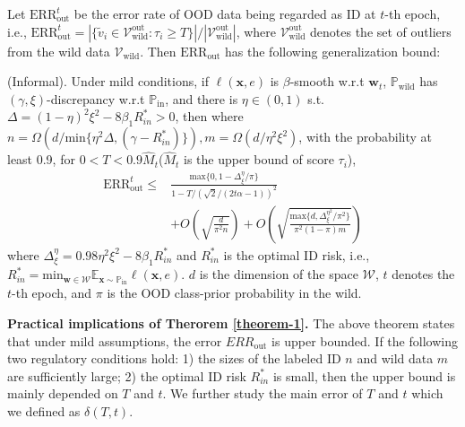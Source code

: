 Let $\text{ERR}_{\text{out}}^t$ be the error rate of OOD data being regarded as ID at $t$-th epoch, i.e.,  $\text{ERR}_{\text{out}}^t = | \{\tilde{v}_i \in \mathcal{V}_{\text{wild}}^{\text{out}}: \tau_i \geq T \} | / |  \mathcal{V}_{\text{wild}}^{\text{out}} |$, where $\mathcal{V}_{\text{wild}}^{\text{out}}$ denotes the set of outliers from the wild data $\mathcal{V}_{\text{wild}}$. Then $\text{ERR}_{\text{out}} $ has the following generalization bound:
\begin{theorem}\label{theorem-1}
(Informal). Under mild conditions, if $\ell(\mathbf{x}, e)$ is $\beta$-smooth w.r.t $\mathbf{w}_t$, $\mathbb{P}_{\mathrm{wild}}$ has $(\gamma, \xi)$-discrepancy w.r.t $\mathbb{P}_{\mathrm{in}}$, and there is $\eta \in (0,1)$ s.t. $\Delta = (1-\eta)^2\xi^2 - 8\beta_1 R_{in}^{*}>0$, then where $n = \Omega(d/\mathrm{min}\{ \eta^2\Delta, (\gamma-R_{in}^{*})\}), m = \Omega(d/\eta^2\xi^2)$, with the probability at least 0.9, for $0 < T < 0.9\widehat{M}_t$($\widehat{M}_t$ is the upper bound of score $\tau_i$),
\begin{equation} \label{equa:ERR_out^t}
\begin{split}
     \text{ERR}_{\text{out}}^t \leq & \frac{\mathrm{max}\{0, 1-\Delta_{\xi}^{\eta}/\pi\}}{1-T/(\sqrt{2}/(2t\alpha - 1))^2}\\
     &+ O(\sqrt{\frac{d}{\pi^2 n}}) + O(\sqrt{\frac{\mathrm{max}\{d, \Delta_{\xi}^{\eta^2}/\pi^2\}}{\pi^2(1-\pi)m}})
\end{split}
\end{equation}
where $
\Delta_{\xi}^{\eta} = 0.98\eta^2\xi^2 - 8\beta_1 R_{in}^{*}
$ and  $R_{in}^{*}$ is the optimal ID risk, i.e., $R_{in}^{*} = \mathrm{min}_{\mathbf{w}\in \mathcal{W}}\mathbb{E_{\mathbf{x}\sim\mathbb{P}_{\mathrm{in}}}}\ell(\mathbf{x}, e)$.
$d$ is  the dimension of the space $\mathcal{W}$, $t$ denotes the $t$-th epoch, and $\pi$ is the OOD class-prior probability in the wild.
\end{theorem}
\textbf{Practical implications of Therorem \ref{theorem-1}.} The above theorem states that under mild assumptions, the error $ERR_{\mathrm{out}}$ is upper bounded. If the following two regulatory conditions hold: 1) the sizes of the labeled ID $n$ and wild data $m$ are sufficiently large; 2) the optimal ID risk $R_{in}^{*}$ is small, then the upper bound is mainly depended on $T$ and $t$. We further study the main error of $T$ and $t$ which we defined as $\delta(T, t)$.
